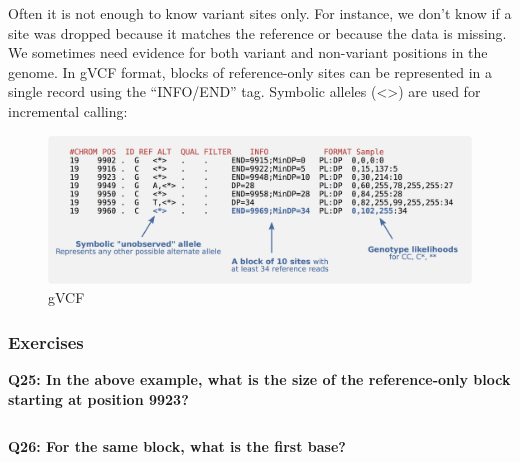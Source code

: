 \documentclass[11pt]{article}
\makeatletter
\newcommand{\boxspacing}{\kern\kvtcb@left@rule\kern\kvtcb@boxsep}
\newcommand{\prompt}[4]{
        {\ttfamily\llap{{\color{#2}[#3]:\hspace{3pt}#4}}\vspace{-\baselineskip}}
    }
\makeatother
\begin{document}
Often it is not enough to know variant sites only. For instance, we
don't know if a site was dropped because it matches the reference or
because the data is missing. We sometimes need evidence for both variant
and non-variant positions in the genome. In gVCF format, blocks of
reference-only sites can be represented in a single record using the
``INFO/END'' tag. Symbolic alleles (\textless*\textgreater) are used for
incremental calling:

    \begin{figure}
\centering
\includegraphics{img/gVCF.png}
\caption{gVCF}
\end{figure}

    \hypertarget{exercises}{%
\subsubsection{Exercises}\label{exercises}}

\textbf{Q25: In the above example, what is the size of the
reference-only block starting at position 9923?}

    \begin{tcolorbox}[breakable, size=fbox, boxrule=1pt, pad at break*=1mm,colback=cellbackground, colframe=cellborder]
\prompt{In}{incolor}{ }{\boxspacing}
\begin{Verbatim}[commandchars=\\\{\}]

\end{Verbatim}
\end{tcolorbox}

    \textbf{Q26: For the same block, what is the first base?}

    \begin{tcolorbox}[breakable, size=fbox, boxrule=1pt, pad at break*=1mm,colback=cellbackground, colframe=cellborder]
\prompt{In}{incolor}{ }{\boxspacing}
\begin{Verbatim}[commandchars=\\\{\}]

\end{Verbatim}
\end{tcolorbox}
\end{document}
